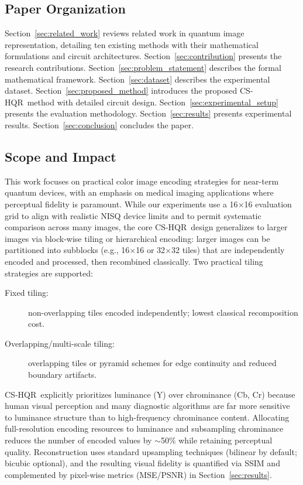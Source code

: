 \documentclass{ipol}
\newcommand{\cshqr}{\textsc{CS-HQR}}
\begin{document}
\FloatBarrier
\subsection{Paper Organization}
\label{subsec:paper_organization}

Section~\ref{sec:related_work} reviews related work in quantum image
representation, detailing ten existing methods with their mathematical
formulations and circuit architectures. Section~\ref{sec:contribution}
presents the research contributions. Section~\ref{sec:problem_statement}
describes the formal mathematical framework. Section~\ref{sec:dataset}
describes the experimental dataset. Section~\ref{sec:proposed_method}
introduces the proposed \cshqr\ method with detailed circuit design.
Section~\ref{sec:experimental_setup} presents the evaluation methodology.
Section~\ref{sec:results} presents experimental results. Section~\ref{sec:conclusion}
concludes the paper.

\FloatBarrier
\subsection{Scope and Impact}
\label{subsec:scope}

This work focuses on practical color image encoding strategies for near-term
quantum devices, with an emphasis on medical imaging applications where
perceptual fidelity is paramount. While our experiments use a 16$\times$16
evaluation grid to align with realistic NISQ device limits and to permit
systematic comparison across many images, the core \cshqr\ design generalizes
to larger images via block-wise tiling or hierarchical encoding: larger images
can be partitioned into subblocks (e.g., 16$\times$16 or 32$\times$32
tiles) that are independently encoded and processed, then recombined
classically. Two practical tiling strategies are supported:
\begin{description}
  \item[Fixed tiling:] non-overlapping tiles encoded independently; lowest
    classical recomposition cost.
  \item[Overlapping/multi-scale tiling:] overlapping tiles or pyramid schemes
    for edge continuity and reduced boundary artifacts.
\end{description}

\cshqr\ explicitly prioritizes luminance (Y) over chrominance (Cb, Cr)
because human visual perception and many diagnostic algorithms are far more
sensitive to luminance structure than to high-frequency chrominance content.
Allocating full-resolution encoding resources to luminance and subsampling
chrominance reduces the number of encoded values by $\sim$50\% while
retaining perceptual quality. Reconstruction uses standard upsampling
techniques (bilinear by default; bicubic optional), and the resulting
visual fidelity is quantified via SSIM and complemented by pixel-wise
metrics (MSE/PSNR) in Section~\ref{sec:results}.
\end{document}
